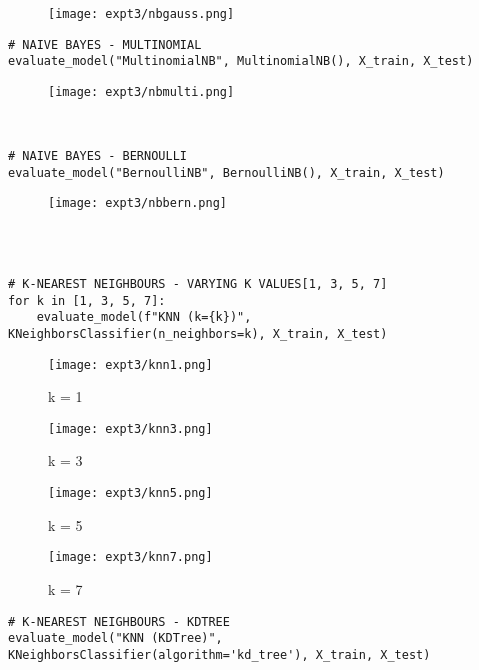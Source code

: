 \documentclass[11pt]{article}
\begin{document}
\begin{figure}[H]
\centering
\texttt{[image: expt3/nbgauss.png]} 
\end{figure}

\begin{verbatim}
# NAIVE BAYES - MULTINOMIAL
evaluate_model("MultinomialNB", MultinomialNB(), X_train, X_test)
\end{verbatim}

\begin{figure}[H]
\centering
\texttt{[image: expt3/nbmulti.png]} 
\end{figure}

\begin{verbatim}


# NAIVE BAYES - BERNOULLI
evaluate_model("BernoulliNB", BernoulliNB(), X_train, X_test)
\end{verbatim}

\begin{figure}[H]
\centering
\texttt{[image: expt3/nbbern.png]} 
\end{figure}

\begin{verbatim}



# K-NEAREST NEIGHBOURS - VARYING K VALUES[1, 3, 5, 7]
for k in [1, 3, 5, 7]:
    evaluate_model(f"KNN (k={k})", KNeighborsClassifier(n_neighbors=k), X_train, X_test)
\end{verbatim}

\begin{figure}[H]
\centering
\texttt{[image: expt3/knn1.png]} 
\caption{k = 1}
\end{figure}

\begin{figure}[H]
\centering
\texttt{[image: expt3/knn3.png]} 
\caption{k = 3}
\end{figure}

\begin{figure}[H]
\centering
\texttt{[image: expt3/knn5.png]} 
\caption{k = 5}
\end{figure}

\begin{figure}[H]
\centering
\texttt{[image: expt3/knn7.png]} 
\caption{k = 7}
\end{figure}

\begin{verbatim}
# K-NEAREST NEIGHBOURS - KDTREE
evaluate_model("KNN (KDTree)", KNeighborsClassifier(algorithm='kd_tree'), X_train, X_test)
\end{verbatim}
\end{document}
